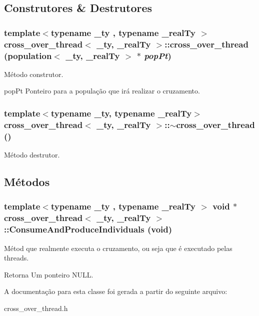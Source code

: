 \subsection{Construtores \& Destrutores}
\hypertarget{classcross__over__thread_acaa709237e2789b033adb64a7217059b}{
\subsubsection[{cross\_\-over\_\-thread}]{\setlength{\rightskip}{0pt plus 5cm}template$<$typename \_\-ty , typename \_\-realTy $>$ {\bf cross\_\-over\_\-thread}$<$ \_\-ty, \_\-realTy $>$::{\bf cross\_\-over\_\-thread} ({\bf population}$<$ \_\-ty, \_\-realTy $>$ $\ast$ {\em popPt})}}
\label{classcross__over__thread_acaa709237e2789b033adb64a7217059b}
Método construtor.

popPt Ponteiro para a população que irá realizar o cruzamento. \hypertarget{classcross__over__thread_ac0399322791eac4c1e09d1f60653c610}{
\subsubsection[{$\sim$cross\_\-over\_\-thread}]{\setlength{\rightskip}{0pt plus 5cm}template$<$typename \_\-ty, typename \_\-realTy$>$ {\bf cross\_\-over\_\-thread}$<$ \_\-ty, \_\-realTy $>$::$\sim${\bf cross\_\-over\_\-thread} ()}}
\label{classcross__over__thread_ac0399322791eac4c1e09d1f60653c610}
Método destrutor. 

\subsection{Métodos}
\hypertarget{classcross__over__thread_a7cc2e9564ebe457e7e7c25d107b5da78}{
\subsubsection[{ConsumeAndProduceIndividuals}]{\setlength{\rightskip}{0pt plus 5cm}template$<$typename \_\-ty , typename \_\-realTy $>$ void $\ast$ {\bf cross\_\-over\_\-thread}$<$ \_\-ty, \_\-realTy $>$::ConsumeAndProduceIndividuals (void)}}
\label{classcross__over__thread_a7cc2e9564ebe457e7e7c25d107b5da78}
Métod que realmente executa o cruzamento, ou seja que é executado pelas threads.

\begin{DoxyReturn}{Retorna}
Um ponteiro NULL. 
\end{DoxyReturn}


A documentação para esta classe foi gerada a partir do seguinte arquivo:\begin{DoxyCompactItemize}
\item 
cross\_\-over\_\-thread.h\end{DoxyCompactItemize}
